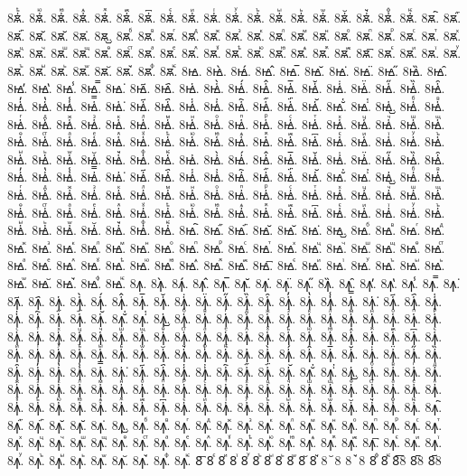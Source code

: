 {8ꙛ҆ⷺ.
8ꙛ҆ⷻ.
8ꙛ҆ⷼ.
8ꙛ҆ⷽ.
8ꙛ҆ⷾ.
8ꙛ҆ⷿ.
8ꙛ҆꙯.
8ꙛ҆ꙴ.
8ꙛ҆ꙵ.
8ꙛ҆ꙶ.
8ꙛ҆ꙷ.
8ꙛ҆ꙸ.
8ꙛ҆ꙹ.
8ꙛ҆ꙺ.
8ꙛ҆ꙻ.
8ꙛ҆꙼.
8ꙛ҆꙽.
8ꙛ҆ꚞ.
8ꙛ҆ꚟ.
8ꙛ҇.
8ꙛ᷀.
8ꙛ᷁.
8ꙛ᷶.
8ꙛ᷷.
8ꙛ᷸.
8ꙛ᷹.
8ꙛⷠ.
8ꙛⷡ.
8ꙛⷢ.
8ꙛⷣ.
8ꙛⷤ.
8ꙛⷥ.
8ꙛⷦ.
8ꙛⷧ.
8ꙛⷨ.
8ꙛⷩ.
8ꙛⷪ.
8ꙛⷫ.
8ꙛⷬ.
8ꙛⷭ.
8ꙛⷮ.
8ꙛⷯ.
8ꙛⷰ.
8ꙛⷱ.
8ꙛⷲ.
8ꙛⷳ.
8ꙛⷴ.
8ꙛⷵ.
8ꙛⷶ.
8ꙛⷷ.
8ꙛⷸ.
8ꙛⷹ.
8ꙛⷺ.
8ꙛⷻ.
8ꙛⷼ.
8ꙛⷽ.
8ꙛⷾ.
8ꙛⷿ.
8ꙛ꙯.
8ꙛꙴ.
8ꙛꙵ.
8ꙛꙶ.
8ꙛꙷ.
8ꙛꙸ.
8ꙛꙹ.
8ꙛꙺ.
8ꙛꙻ.
8ꙛ꙼.
8ꙛ꙽.
8ꙛꚞ.
8ꙛꚟ.
8ꙝ.
8ꙝ̀.
8ꙝ́.
8ꙝ̂.
8ꙝ̅.
8ꙝ̆.
8ꙝ̇.
8ꙝ̈.
8ꙝ̋.
8ꙝ̏.
8ꙝ̑.
8ꙝ̓.
8ꙝ̔.
8ꙝ̾.
8ꙝ̿.
8ꙝ͘.
8ꙝ҃.
8ꙝ҄.
8ꙝ҅.
8ꙝ҅̀.
8ꙝ҅́.
8ꙝ҅̂.
8ꙝ҅̅.
8ꙝ҅̆.
8ꙝ҅̇.
8ꙝ҅̈.
8ꙝ҅̋.
8ꙝ҅̏.
8ꙝ҅̑.
8ꙝ҅̓.
8ꙝ҅̔.
8ꙝ҅̾.
8ꙝ҅̿.
8ꙝ҅͘.
8ꙝ҅҃.
8ꙝ҅҄.
8ꙝ҅҅.
8ꙝ҅҆.
8ꙝ҅҇.
8ꙝ҅᷀.
8ꙝ҅᷁.
8ꙝ҅᷶.
8ꙝ᷷҅.
8ꙝ᷸҅.
8ꙝ᷹҅.
8ꙝ҅ⷠ.
8ꙝ҅ⷡ.
8ꙝ҅ⷢ.
8ꙝ҅ⷣ.
8ꙝ҅ⷤ.
8ꙝ҅ⷥ.
8ꙝ҅ⷦ.
8ꙝ҅ⷧ.
8ꙝ҅ⷨ.
8ꙝ҅ⷩ.
8ꙝ҅ⷪ.
8ꙝ҅ⷫ.
8ꙝ҅ⷬ.
8ꙝ҅ⷭ.
8ꙝ҅ⷮ.
8ꙝ҅ⷯ.
8ꙝ҅ⷰ.
8ꙝ҅ⷱ.
8ꙝ҅ⷲ.
8ꙝ҅ⷳ.
8ꙝ҅ⷴ.
8ꙝ҅ⷵ.
8ꙝ҅ⷶ.
8ꙝ҅ⷷ.
8ꙝ҅ⷸ.
8ꙝ҅ⷹ.
8ꙝ҅ⷺ.
8ꙝ҅ⷻ.
8ꙝ҅ⷼ.
8ꙝ҅ⷽ.
8ꙝ҅ⷾ.
8ꙝ҅ⷿ.
8ꙝ҅꙯.
8ꙝ҅ꙴ.
8ꙝ҅ꙵ.
8ꙝ҅ꙶ.
8ꙝ҅ꙷ.
8ꙝ҅ꙸ.
8ꙝ҅ꙹ.
8ꙝ҅ꙺ.
8ꙝ҅ꙻ.
8ꙝ҅꙼.
8ꙝ҅꙽.
8ꙝ҅ꚞ.
8ꙝ҅ꚟ.
8ꙝ҆.
8ꙝ҆̀.
8ꙝ҆́.
8ꙝ҆̂.
8ꙝ҆̅.
8ꙝ҆̆.
8ꙝ҆̇.
8ꙝ҆̈.
8ꙝ҆̋.
8ꙝ҆̏.
8ꙝ҆̑.
8ꙝ҆̓.
8ꙝ҆̔.
8ꙝ҆̾.
8ꙝ҆̿.
8ꙝ҆͘.
8ꙝ҆҃.
8ꙝ҆҄.
8ꙝ҆҅.
8ꙝ҆҆.
8ꙝ҆҇.
8ꙝ҆᷀.
8ꙝ҆᷁.
8ꙝ҆᷶.
8ꙝ᷷҆.
8ꙝ᷸҆.
8ꙝ᷹҆.
8ꙝ҆ⷠ.
8ꙝ҆ⷡ.
8ꙝ҆ⷢ.
8ꙝ҆ⷣ.
8ꙝ҆ⷤ.
8ꙝ҆ⷥ.
8ꙝ҆ⷦ.
8ꙝ҆ⷧ.
8ꙝ҆ⷨ.
8ꙝ҆ⷩ.
8ꙝ҆ⷪ.
8ꙝ҆ⷫ.
8ꙝ҆ⷬ.
8ꙝ҆ⷭ.
8ꙝ҆ⷮ.
8ꙝ҆ⷯ.
8ꙝ҆ⷰ.
8ꙝ҆ⷱ.
8ꙝ҆ⷲ.
8ꙝ҆ⷳ.
8ꙝ҆ⷴ.
8ꙝ҆ⷵ.
8ꙝ҆ⷶ.
8ꙝ҆ⷷ.
8ꙝ҆ⷸ.
8ꙝ҆ⷹ.
8ꙝ҆ⷺ.
8ꙝ҆ⷻ.
8ꙝ҆ⷼ.
8ꙝ҆ⷽ.
8ꙝ҆ⷾ.
8ꙝ҆ⷿ.
8ꙝ҆꙯.
8ꙝ҆ꙴ.
8ꙝ҆ꙵ.
8ꙝ҆ꙶ.
8ꙝ҆ꙷ.
8ꙝ҆ꙸ.
8ꙝ҆ꙹ.
8ꙝ҆ꙺ.
8ꙝ҆ꙻ.
8ꙝ҆꙼.
8ꙝ҆꙽.
8ꙝ҆ꚞ.
8ꙝ҆ꚟ.
8ꙝ҇.
8ꙝ᷀.
8ꙝ᷁.
8ꙝ᷶.
8ꙝ᷷.
8ꙝ᷸.
8ꙝ᷹.
8ꙝⷠ.
8ꙝⷡ.
8ꙝⷢ.
8ꙝⷣ.
8ꙝⷤ.
8ꙝⷥ.
8ꙝⷦ.
8ꙝⷧ.
8ꙝⷨ.
8ꙝⷩ.
8ꙝⷪ.
8ꙝⷫ.
8ꙝⷬ.
8ꙝⷭ.
8ꙝⷮ.
8ꙝⷯ.
8ꙝⷰ.
8ꙝⷱ.
8ꙝⷲ.
8ꙝⷳ.
8ꙝⷴ.
8ꙝⷵ.
8ꙝⷶ.
8ꙝⷷ.
8ꙝⷸ.
8ꙝⷹ.
8ꙝⷺ.
8ꙝⷻ.
8ꙝⷼ.
8ꙝⷽ.
8ꙝⷾ.
8ꙝⷿ.
8ꙝ꙯.
8ꙝꙴ.
8ꙝꙵ.
8ꙝꙶ.
8ꙝꙷ.
8ꙝꙸ.
8ꙝꙹ.
8ꙝꙺ.
8ꙝꙻ.
8ꙝ꙼.
8ꙝ꙽.
8ꙝꚞ.
8ꙝꚟ.
8ꙟ.
8ꙟ̀.
8ꙟ́.
8ꙟ̂.
8ꙟ̅.
8ꙟ̆.
8ꙟ̇.
8ꙟ̈.
8ꙟ̋.
8ꙟ̏.
8ꙟ̑.
8ꙟ̓.
8ꙟ̔.
8ꙟ̾.
8ꙟ̿.
8ꙟ͘.
8ꙟ҃.
8ꙟ҄.
8ꙟ҅.
8ꙟ҅̀.
8ꙟ҅́.
8ꙟ҅̂.
8ꙟ҅̅.
8ꙟ҅̆.
8ꙟ҅̇.
8ꙟ҅̈.
8ꙟ҅̋.
8ꙟ҅̏.
8ꙟ҅̑.
8ꙟ҅̓.
8ꙟ҅̔.
8ꙟ҅̾.
8ꙟ҅̿.
8ꙟ҅͘.
8ꙟ҅҃.
8ꙟ҅҄.
8ꙟ҅҅.
8ꙟ҅҆.
8ꙟ҅҇.
8ꙟ҅᷀.
8ꙟ҅᷁.
8ꙟ҅᷶.
8ꙟ᷷҅.
8ꙟ᷸҅.
8ꙟ᷹҅.
8ꙟ҅ⷠ.
8ꙟ҅ⷡ.
8ꙟ҅ⷢ.
8ꙟ҅ⷣ.
8ꙟ҅ⷤ.
8ꙟ҅ⷥ.
8ꙟ҅ⷦ.
8ꙟ҅ⷧ.
8ꙟ҅ⷨ.
8ꙟ҅ⷩ.
8ꙟ҅ⷪ.
8ꙟ҅ⷫ.
8ꙟ҅ⷬ.
8ꙟ҅ⷭ.
8ꙟ҅ⷮ.
8ꙟ҅ⷯ.
8ꙟ҅ⷰ.
8ꙟ҅ⷱ.
8ꙟ҅ⷲ.
8ꙟ҅ⷳ.
8ꙟ҅ⷴ.
8ꙟ҅ⷵ.
8ꙟ҅ⷶ.
8ꙟ҅ⷷ.
8ꙟ҅ⷸ.
8ꙟ҅ⷹ.
8ꙟ҅ⷺ.
8ꙟ҅ⷻ.
8ꙟ҅ⷼ.
8ꙟ҅ⷽ.
8ꙟ҅ⷾ.
8ꙟ҅ⷿ.
8ꙟ҅꙯.
8ꙟ҅ꙴ.
8ꙟ҅ꙵ.
8ꙟ҅ꙶ.
8ꙟ҅ꙷ.
8ꙟ҅ꙸ.
8ꙟ҅ꙹ.
8ꙟ҅ꙺ.
8ꙟ҅ꙻ.
8ꙟ҅꙼.
8ꙟ҅꙽.
8ꙟ҅ꚞ.
8ꙟ҅ꚟ.
8ꙟ҆.
8ꙟ҆̀.
8ꙟ҆́.
8ꙟ҆̂.
8ꙟ҆̅.
8ꙟ҆̆.
8ꙟ҆̇.
8ꙟ҆̈.
8ꙟ҆̋.
8ꙟ҆̏.
8ꙟ҆̑.
8ꙟ҆̓.
8ꙟ҆̔.
8ꙟ҆̾.
8ꙟ҆̿.
8ꙟ҆͘.
8ꙟ҆҃.
8ꙟ҆҄.
8ꙟ҆҅.
8ꙟ҆҆.
8ꙟ҆҇.
8ꙟ҆᷀.
8ꙟ҆᷁.
8ꙟ҆᷶.
8ꙟ᷷҆.
8ꙟ᷸҆.
8ꙟ᷹҆.
8ꙟ҆ⷠ.
8ꙟ҆ⷡ.
8ꙟ҆ⷢ.
8ꙟ҆ⷣ.
8ꙟ҆ⷤ.
8ꙟ҆ⷥ.
8ꙟ҆ⷦ.
8ꙟ҆ⷧ.
8ꙟ҆ⷨ.
8ꙟ҆ⷩ.
8ꙟ҆ⷪ.
8ꙟ҆ⷫ.
8ꙟ҆ⷬ.
8ꙟ҆ⷭ.
8ꙟ҆ⷮ.
8ꙟ҆ⷯ.
8ꙟ҆ⷰ.
8ꙟ҆ⷱ.
8ꙟ҆ⷲ.
8ꙟ҆ⷳ.
8ꙟ҆ⷴ.
8ꙟ҆ⷵ.
8ꙟ҆ⷶ.
8ꙟ҆ⷷ.
8ꙟ҆ⷸ.
8ꙟ҆ⷹ.
8ꙟ҆ⷺ.
8ꙟ҆ⷻ.
8ꙟ҆ⷼ.
8ꙟ҆ⷽ.
8ꙟ҆ⷾ.
8ꙟ҆ⷿ.
8ꙟ҆꙯.
8ꙟ҆ꙴ.
8ꙟ҆ꙵ.
8ꙟ҆ꙶ.
8ꙟ҆ꙷ.
8ꙟ҆ꙸ.
8ꙟ҆ꙹ.
8ꙟ҆ꙺ.
8ꙟ҆ꙻ.
8ꙟ҆꙼.
8ꙟ҆꙽.
8ꙟ҆ꚞ.
8ꙟ҆ꚟ.
8ꙟ҇.
8ꙟ᷀.
8ꙟ᷁.
8ꙟ᷶.
8ꙟ᷷.
8ꙟ᷸.
8ꙟ᷹.
8ꙟⷠ.
8ꙟⷡ.
8ꙟⷢ.
8ꙟⷣ.
8ꙟⷤ.
8ꙟⷥ.
8ꙟⷦ.
8ꙟⷧ.
8ꙟⷨ.
8ꙟⷩ.
8ꙟⷪ.
8ꙟⷫ.
8ꙟⷬ.
8ꙟⷭ.
8ꙟⷮ.
8ꙟⷯ.
8ꙟⷰ.
8ꙟⷱ.
8ꙟⷲ.
8ꙟⷳ.
8ꙟⷴ.
8ꙟⷵ.
8ꙟⷶ.
8ꙟⷷ.
8ꙟⷸ.
8ꙟⷹ.
8ꙟⷺ.
8ꙟⷻ.
8ꙟⷼ.
8ꙟⷽ.
8ꙟⷾ.
8ꙟⷿ.
8ꙟ꙯.
8ꙟꙴ.
8ꙟꙵ.
8ꙟꙶ.
8ꙟꙷ.
8ꙟꙸ.
8ꙟꙹ.
8ꙟꙺ.
8ꙟꙻ.
8ꙟ꙼.
8ꙟ꙽.
8ꙟꚞ.
8ꙟꚟ.
8꙯
8ꙴ
8ꙵ
8ꙶ
8ꙷ
8ꙸ
8ꙹ
8ꙺ
8ꙻ
8꙼
8꙽
8꙾8
8ꙿ8
8ꚞ
8ꚟ
8︦8
8︮8
8︯8
}
